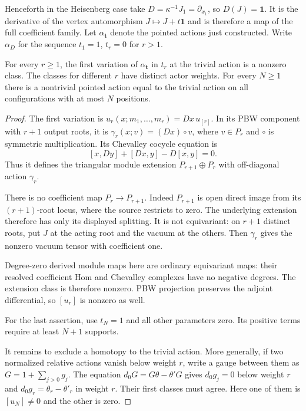 Henceforth in the Heisenberg case take
$D=\kappa^{-1}J_1=\partial_{x_1}$, so $D(J)=\mathbf1$.
It is the derivative of the vertex automorphism
$J\mapsto J+t\mathbf1$ and is therefore a map
of the full coefficient family.
Let $\alpha_{\mathbf t}$ denote the pointed
actions just constructed. Write $\alpha_D$ for
the sequence $t_1=1$, $t_r=0$ for $r>1$.

\begin{proposition}\label{cbc:va:leading-profiles}
For every $r\geq1$, the first variation of
$\alpha_{\mathbf t}$ in $t_r$ at the trivial
action is a nonzero class. The classes for
different $r$ have distinct actor weights.
For every $N\geq1$ there is a nontrivial pointed
action equal to the trivial action on all
configurations with at most $N$ positions.
\end{proposition}
\begin{proof}
The first variation is
$u_r(x;m_1,\ldots,m_r)=Dx\,u_{[r]}$.
In its PBW component with $r+1$ output roots,
it is $\gamma_r(x;v)=(Dx)\circ v$, where
$v\in P_r$ and $\circ$ is symmetric multiplication.
Its Chevalley cocycle equation is
\[
 [x,Dy]+[Dx,y]-D[x,y]=0.
\]
Thus it defines the triangular module extension
$P_{r+1}\oplus P_r$ with off-diagonal action
$\gamma_r$.

There is no coefficient map $P_r\to P_{r+1}$.
Indeed $P_{r+1}$ is open direct image from its
$(r+1)$-root locus, where the source restricts
to zero. The underlying extension therefore
has only its displayed splitting. It is not
equivariant: on $r+1$ distinct roots, put $J$
at the acting root and the vacuum at the others.
Then $\gamma_r$ gives the nonzero vacuum tensor
with coefficient one.

Degree-zero derived module maps here are ordinary
equivariant maps: their resolved coefficient Hom
and Chevalley complexes have no negative degrees.
The extension class is therefore nonzero.
PBW projection preserves the adjoint differential,
so $[u_r]$ is nonzero as well.

For the last assertion, use $t_N=1$ and all
other parameters zero. Its positive terms
require at least $N+1$ supports.

It remains to exclude a homotopy to the trivial
action. More generally, if two normalized
relative actions vanish below weight $r$,
write a gauge between them as $G=1+\sum_{j>0}g_j$.
The equation $d_0G=G\theta-\theta'G$ gives
$d_0g_j=0$ below weight $r$ and
$d_0g_r=\theta_r-\theta'_r$ in weight $r$.
Their first classes must agree. Here one of
them is $[u_N]\ne0$ and the other is zero.
\end{proof}

